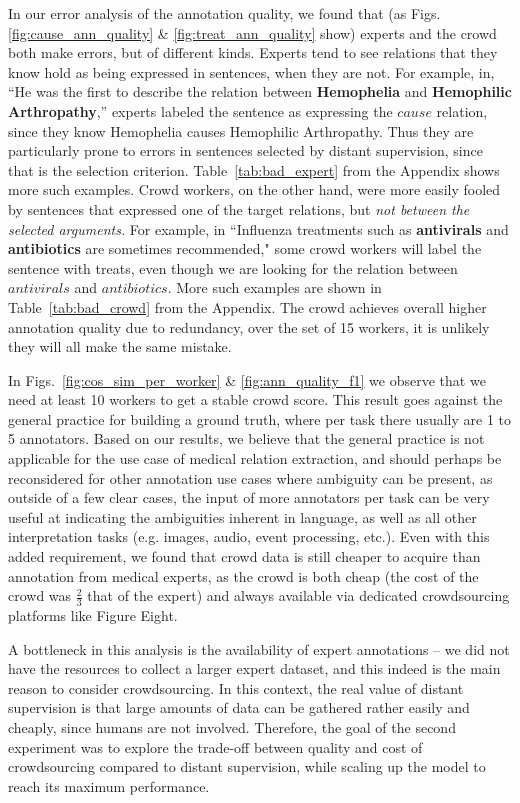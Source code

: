 In our error analysis of the annotation quality, we found that (as Figs. \ref{fig:cause_ann_quality} \& \ref{fig:treat_ann_quality} show) experts and the crowd both make errors, but of different kinds.  Experts tend to see relations that they know hold as being expressed in sentences, when they are not.  For example, in, ``He was the first to describe the relation between \textbf{Hemophelia} and \textbf{Hemophilic Arthropathy},'' experts labeled the sentence as expressing the $cause$ relation, since they know Hemophelia causes Hemophilic Arthropathy.  Thus they are particularly prone to errors in sentences selected by distant supervision, since that is the selection criterion. Table~\ref{tab:bad_expert} from the Appendix shows more such examples.  Crowd workers, on the other hand, were more easily fooled by sentences that expressed one of the target relations, but {\em not between the selected arguments.}  For example, in ``Influenza treatments such as \textbf{antivirals} and \textbf{antibiotics} are sometimes recommended," some crowd workers will label the sentence with treats, even though we are looking for the relation between $antivirals$ and $antibiotics$. More such examples are shown in Table~\ref{tab:bad_crowd} from the Appendix. The crowd achieves overall higher annotation quality due to redundancy, over the set of 15 workers, it is unlikely they will all make the same mistake.

In Figs.~\ref{fig:cos_sim_per_worker} \& \ref{fig:ann_quality_f1} we observe that we need at least 10 workers to get a stable crowd score. This result goes against the general practice for building a ground truth, where per task there usually are 1 to 5 annotators. Based on our results, we believe that the general practice is not applicable for the use case of medical relation extraction, and should perhaps be reconsidered for other annotation use cases where ambiguity can be present, as outside of a few clear cases, the input of more annotators per task can be very useful at indicating the ambiguities inherent in language, as well as all other interpretation tasks (e.g. images, audio, event processing, etc.). Even with this added requirement, we found that crowd data is still cheaper to acquire than annotation from medical experts, as the crowd is both cheap (the cost of the crowd was $\frac{2}{3}$ that of the expert) and always available via dedicated crowdsourcing platforms like Figure Eight.

A bottleneck in this analysis is the availability of expert annotations -- we did not have the resources to collect a larger expert dataset, and this indeed is the main reason to consider crowdsourcing. In this context, the real value of distant supervision is that large amounts of data can be gathered rather easily and cheaply, since humans are not involved. Therefore, the goal of the second experiment was to explore the trade-off between quality and cost of crowdsourcing compared to distant supervision, while scaling up the model to reach its maximum performance.

